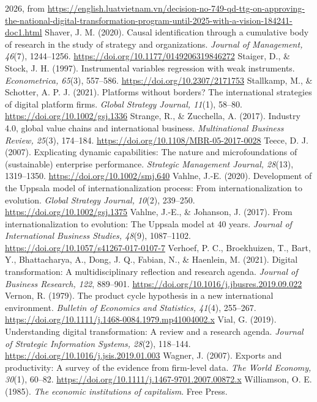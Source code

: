 \documentclass[12pt,a4paper]{article}
\begin{document}
2026, from
\url{https://english.luatvietnam.vn/decision-no-749-qd-ttg-on-approving-the-national-digital-transformation-program-until-2025-with-a-vision-184241-doc1.html}
Shaver, J. M. (2020). Causal identification through a cumulative body of
research in the study of strategy and organizations. \emph{Journal of
Management, 46}(7), 1244--1256.
\url{https://doi.org/10.1177/0149206319846272} Staiger, D., \& Stock, J.
H. (1997). Instrumental variables regression with weak instruments.
\emph{Econometrica, 65}(3), 557--586.
\url{https://doi.org/10.2307/2171753} Stallkamp, M., \& Schotter, A. P.
J. (2021). Platforms without borders? The international strategies of
digital platform firms. \emph{Global Strategy Journal, 11}(1), 58--80.
\url{https://doi.org/10.1002/gsj.1336} Strange, R., \& Zucchella, A.
(2017). Industry 4.0, global value chains and international business.
\emph{Multinational Business Review, 25}(3), 174--184.
\url{https://doi.org/10.1108/MBR-05-2017-0028} Teece, D. J. (2007).
Explicating dynamic capabilities: The nature and microfoundations of
(sustainable) enterprise performance. \emph{Strategic Management
Journal, 28}(13), 1319--1350. \url{https://doi.org/10.1002/smj.640}
Vahlne, J.-E. (2020). Development of the Uppsala model of
internationalization process: From internationalization to evolution.
\emph{Global Strategy Journal, 10}(2), 239--250.
\url{https://doi.org/10.1002/gsj.1375} Vahlne, J.-E., \& Johanson, J.
(2017). From internationalization to evolution: The Uppsala model at 40
years. \emph{Journal of International Business Studies, 48}(9),
1087--1102. \url{https://doi.org/10.1057/s41267-017-0107-7} Verhoef, P.
C., Broekhuizen, T., Bart, Y., Bhattacharya, A., Dong, J. Q., Fabian,
N., \& Haenlein, M. (2021). Digital transformation: A multidisciplinary
reflection and research agenda. \emph{Journal of Business Research,
122}, 889--901. \url{https://doi.org/10.1016/j.jbusres.2019.09.022}
Vernon, R. (1979). The product cycle hypothesis in a new international
environment. \emph{Bulletin of Economics and Statistics, 41}(4),
255--267. \url{https://doi.org/10.1111/j.1468-0084.1979.mp41004002.x}
Vial, G. (2019). Understanding digital transformation: A review and a
research agenda. \emph{Journal of Strategic Information Systems, 28}(2),
118--144. \url{https://doi.org/10.1016/j.jsis.2019.01.003} Wagner, J.
(2007). Exports and productivity: A survey of the evidence from
firm-level data. \emph{The World Economy, 30}(1), 60--82.
\url{https://doi.org/10.1111/j.1467-9701.2007.00872.x} Williamson, O. E.
(1985). \emph{The economic institutions of capitalism}. Free Press.
\end{document}

